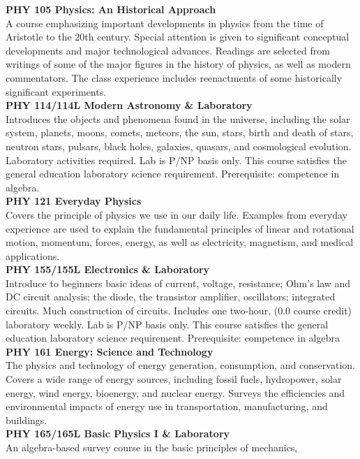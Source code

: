 \documentclass[
  letterpaper,
]{scrbook}
\begin{document}
\textbf{PHY 105 Physics: An Historical Approach}\\
A course emphasizing important developments in physics from the time of
Aristotle to the 20th century. Special attention is given to significant
conceptual developments and major technological advances. Readings are
selected from writings of some of the major figures in the history of
physics, as well as modern commentators. The class experience includes
reenactments of some historically significant experiments.\\
\textbf{PHY 114/114L Modern Astronomy \& Laboratory}\\
Introduces the objects and phenomena found in the universe, including
the solar system, planets, moons, comets, meteors, the sun, stars, birth
and death of stars, neutron stars, pulsars, black holes, galaxies,
quasars, and cosmological evolution. Laboratory activities required. Lab
is P/NP basis only. This course satisfies the general education
laboratory science requirement. Prerequisite: competence in algebra.\\
\textbf{PHY 121 Everyday Physics}\\
Covers the principle of physics we use in our daily life. Examples from
everyday experience are used to explain the fundamental principles of
linear and rotational motion, momentum, forces, energy, as well as
electricity, magnetism, and medical applications.\\
\textbf{PHY 155/155L Electronics \& Laboratory}\\
Introduce to beginners basic ideas of current, voltage, resistance;
Ohm's law and DC circuit analysis; the diode, the transistor amplifier,
oscillators; integrated circuits. Much construction of circuits.
Includes one two-hour, (0.0 course credit) laboratory weekly. Lab is
P/NP basis only. This course satisfies the general education laboratory
science requirement. Prerequisite: competence in algebra\\
\textbf{PHY 161 Energy: Science and Technology}\\
The physics and technology of energy generation, consumption, and
conservation. Covers a wide range of energy sources, including fossil
fuels, hydropower, solar energy, wind energy, bioenergy, and nuclear
energy. Surveys the efficiencies and environmental impacts of energy use
in transportation, manufacturing, and buildings.\\
\textbf{PHY 165/165L Basic Physics I \& Laboratory}\\
An algebra-based survey course in the basic principles of mechanics,
\end{document}
